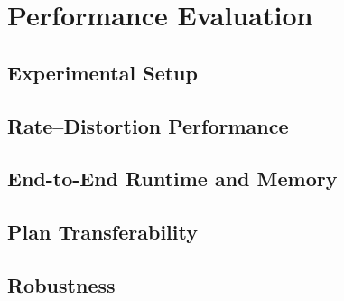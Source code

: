 \section{Performance Evaluation}
\label{sec:evaluation}

\subsection{Experimental Setup}


\subsection{Rate--Distortion Performance}


\subsection{End-to-End Runtime and Memory}


\subsection{Plan Transferability}


\subsection{Robustness}


